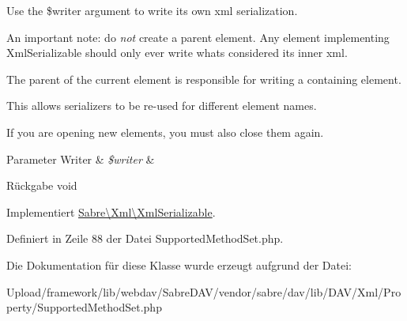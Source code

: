 Use the \$writer argument to write its own xml serialization.

An important note\+: do {\itshape not} create a parent element. Any element implementing Xml\+Serializable should only ever write what\textquotesingle{}s considered its \textquotesingle{}inner xml\textquotesingle{}.

The parent of the current element is responsible for writing a containing element.

This allows serializers to be re-\/used for different element names.

If you are opening new elements, you must also close them again.


\begin{DoxyParams}[1]{Parameter}
Writer & {\em \$writer} & \\
\hline
\end{DoxyParams}
\begin{DoxyReturn}{Rückgabe}
void 
\end{DoxyReturn}


Implementiert \mbox{\hyperlink{interface_sabre_1_1_xml_1_1_xml_serializable_aa78f3ee43aa699be8347181653a53d8c}{Sabre\textbackslash{}\+Xml\textbackslash{}\+Xml\+Serializable}}.



Definiert in Zeile 88 der Datei Supported\+Method\+Set.\+php.



Die Dokumentation für diese Klasse wurde erzeugt aufgrund der Datei\+:\begin{DoxyCompactItemize}
\item 
Upload/framework/lib/webdav/\+Sabre\+D\+A\+V/vendor/sabre/dav/lib/\+D\+A\+V/\+Xml/\+Property/Supported\+Method\+Set.\+php\end{DoxyCompactItemize}
